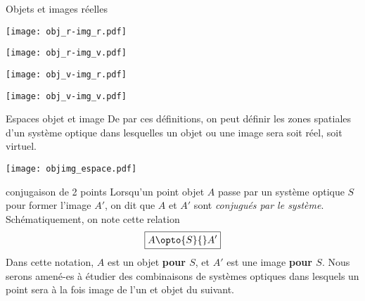 \documentclass[../main/main.tex]{subfiles}
\begin{document}
\begin{exem}[label=exem:rellvirt]{Objets et images réelles}
    \begin{minipage}{0.45\linewidth}
        \begin{center}
            \texttt{[image: obj\_r-img\_r.pdf]}
            \label{fig:objrimgr}
        \end{center}
    \end{minipage}
    \hfill
    \begin{minipage}{0.45\linewidth}
        \begin{center}
            \texttt{[image: obj\_r-img\_v.pdf]}
            \label{fig:objrimgv}
        \end{center}
    \end{minipage}
    \begin{minipage}{0.45\linewidth}
        \begin{center}
            \texttt{[image: obj\_v-img\_r.pdf]}
            \label{fig:objvimgr}
        \end{center}
    \end{minipage}
    \hfill
    \begin{minipage}{0.45\linewidth}
        \begin{center}
            \texttt{[image: obj\_v-img\_v.pdf]}
            \label{fig:objvimgv}
        \end{center}
    \end{minipage}
\end{exem}

\begin{impl}[label=impl:objimg_espace,
             sidebyside, righthand width=.7\textwidth]{Espaces objet et image}
    De par ces définitions, on peut définir les zones spatiales d'un système
    optique dans lesquelles un objet ou une image sera soit réel, soit virtuel.
    \tcblower
    \begin{center}
        \texttt{[image: objimg\_espace.pdf]}
        \label{fig:objimg_espace}
    \end{center}
\end{impl}

\begin{nota}[label=nota_opt]{conjugaison de 2 points}
    Lorsqu'un point objet $A$ passe par un système optique $S$ pour former
    l'image $A'$, on dit que $A$ et $A'$ sont \textit{conjugués par le système}.
    Schématiquement, on note cette relation
    \[\boxed{A\opto{S}{}A'}\]
    Dans cette notation, $A$ est un objet \textbf{pour $S$}, et $A'$ est une
    image \textbf{pour $S$}. Nous serons amené-es à étudier des combinaisons de
    systèmes optiques dans lesquels un point sera à la fois image de l'un et
    objet du suivant.
\end{nota}
\end{document}

